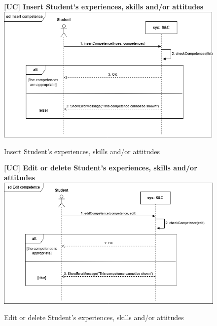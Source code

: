 \begin{figure}[H]
\textbf{[UC\nextUCDiagr] Insert Student’s experiences, skills and/or attitudes}\newline\newline
\includegraphics[width=15cm]{Images/UC_diagram/RASD-UC6.drawio.png}
    \caption{Insert Student’s experiences, skills and/or attitudes}
\end{figure}

\begin{figure}[H]
\textbf{[UC\nextUCDiagr] Edit or delete Student’s experiences, skills and/or attitudes}\newline\newline
\includegraphics[width=15cm]{Images/UC_diagram/RASD-UC7.drawio.png}
    \caption{Edit or delete Student’s experiences, skills and/or attitudes}
\end{figure}


